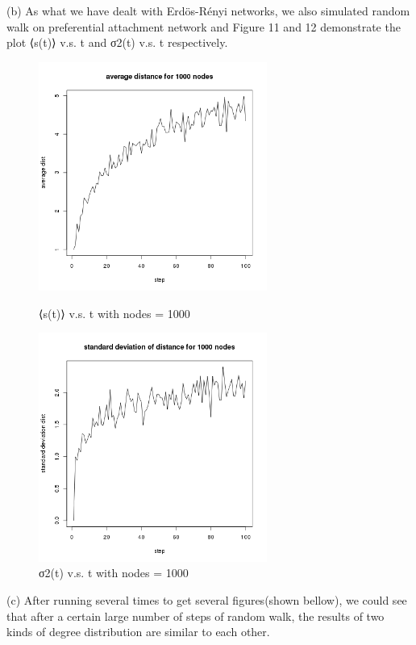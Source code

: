 \documentclass[draftcls,12pt,onecolumn]{IEEEtran}
\begin{document}
(b) As what we have dealt with Erdös-Rényi networks, we also simulated random walk on preferential attachment network and Figure 11 and 12 demonstrate the plot ⟨s(t)⟩ v.s. t and σ2(t) v.s. t respectively.
\begin{figure}[htbp]
\centering
\begin{minipage}[t]{0.48\textwidth}
\centering
\includegraphics[width=7.5cm]{2_2_b_distance.png}
\caption{⟨s(t)⟩ v.s. t with nodes = 1000}
\label{fig10}
\end{minipage}
\begin{minipage}[t]{0.48\textwidth}
\centering
\includegraphics[width=7.5cm]{2_2_b_deviation.png}
\caption{σ2(t) v.s. t with nodes = 1000}
\label{fig11}
\end{minipage}
\end{figure}
(c) After running several times to get several figures(shown bellow), we could see that after a certain large number of steps of random walk, the results of two kinds of degree distribution are similar to each other.
\end{document}
